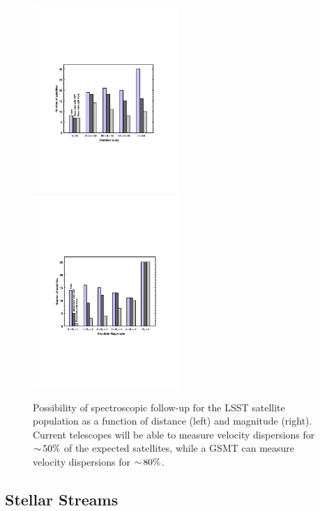 \begin{figure}
  \centering
  \includegraphics[width=0.49\textwidth]{figures/dwarf_observability_barplot_distance.pdf}
  \includegraphics[width=0.50\textwidth]{figures/dwarf_observability_barplot_luminosity.pdf}
  \caption{Possibility of spectroscopic follow-up for the LSST satellite population as a function of distance (left) and magnitude (right). Current telescopes will be able to measure velocity dispersions for $ {\sim}\,50\%$ of the expected satellites, while a GSMT can measure velocity dispersions for $ {\sim}\,80\%$.}
  \label{fig:specfollowup_distance}
\end{figure}

\subsection{Stellar Streams }

